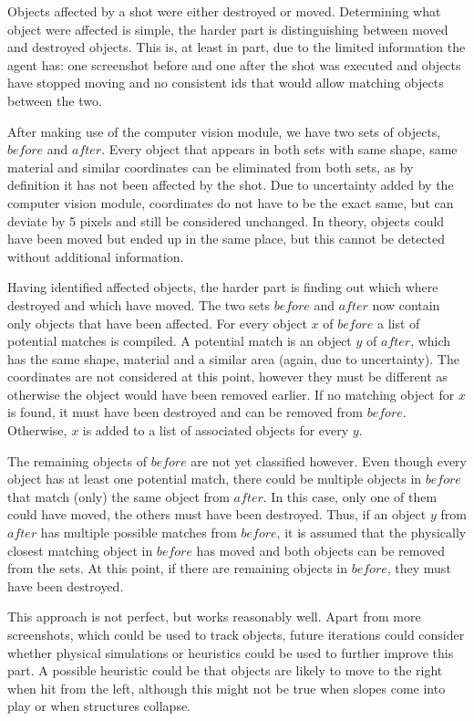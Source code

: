 Objects affected by a shot were either destroyed or moved. Determining what object were affected is simple, the harder part is distinguishing between moved and destroyed objects. This is, at least in part, due to the limited information the agent has: one screenshot before and one after the shot was executed and objects have stopped moving and no consistent ids that would allow matching objects between the two.

After making use of the computer vision module, we have two sets of objects, $before$ and $after$. Every object that appears in both sets with same shape, same material and similar coordinates can be eliminated  from both sets, as by definition it has not been affected by the shot. Due to uncertainty added by the computer vision module, coordinates do not have to be the exact same, but can deviate by 5 pixels and still be considered unchanged. In theory, objects could have been moved but ended up in the same place, but this cannot be detected without additional information.

Having identified affected objects, the harder part is finding out which where destroyed and which have moved. The two sets $before$ and $after$ now contain only objects that have been affected.
For every object $x$ of $before$ a list of potential matches is compiled. A potential match is an object $y$ of $after$, which has the same shape, material and a similar area (again, due to uncertainty). The coordinates are not considered at this point, however they must be different as otherwise the object would have been removed earlier.
If no matching object for $x$ is found, it must have been destroyed and can be removed from $before$. Otherwise, $x$ is added to a list of associated objects for every $y$.

The remaining objects of $before$ are not yet classified however. Even though every object has at least one potential match, there could be multiple objects in $before$ that match (only) the same object from $after$. In this case, only one of them could have moved, the others must have been destroyed. Thus, if an object $y$ from $after$ has multiple possible matches from $before$, it is assumed that the physically closest matching object in $before$ has moved and both objects can be removed from the sets. At this point, if there are remaining objects in $before$, they must have been destroyed.

This approach is not perfect, but works reasonably well. Apart from more screenshots, which could be used to track objects, future iterations could consider whether physical simulations or heuristics could be used to further improve this part. A possible heuristic could be that objects are likely to move to the right when hit from the left, although this might not be true when slopes come into play or when structures collapse.


